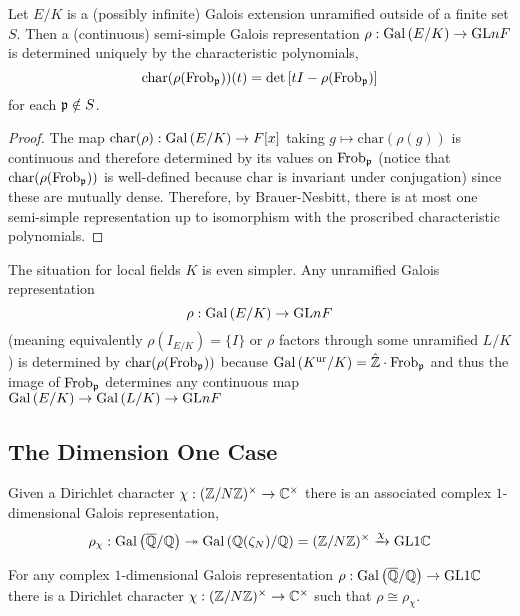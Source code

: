 \documentclass[12pt]{article}
\begin{document}
\begin{thm}
Let $E/K$ is a (possibly infinite) Galois extension unramified outside of a finite set $S$. Then a (continuous) semi-simple Galois representation $\rho : \mathrm{Gal}\left( E/K \right) \to \mathrm{GL}{n}{F}$ is determined uniquely by the characteristic polynomials,
\[ \mathrm{char}(\rho(\mathrm{Frob}_{\mathfrak{p}}))(t) = \det{[t I - \rho(\mathrm{Frob}_{\mathfrak{p}})]} \]
for each $\mathfrak{p} \notin S$.
\end{thm}

\begin{proof}
The map $\mathrm{char}(\rho) : \mathrm{Gal}\left( E/K \right) \to F[x]$ taking $g \mapsto \mathrm{char}(\rho(g))$ is continuous and therefore determined by its values on $\mathrm{Frob}_{\mathfrak{p}}$ (notice that $\mathrm{char}(\rho(\mathrm{Frob}_{\mathfrak{p}}))$ is well-defined because $\mathrm{char}$ is invariant under conjugation) since these are mutually dense. Therefore, by Brauer-Nesbitt, there is at most one semi-simple representation up to isomorphism with the proscribed characteristic polynomials.
\end{proof}

\begin{rmk}
The situation for local fields $K$ is even simpler. Any unramified Galois representation 
\[ \rho : \mathrm{Gal}\left( E/K \right) \to \mathrm{GL}{n}{F} \]
(meaning equivalently $\rho(I_{E/K}) = \{ I \}$ or $\rho$ factors through some unramified $L/K$) is determined by $\mathrm{char}(\rho(\mathrm{Frob}_{\mathfrak{p}}))$ because $\mathrm{Gal}\left( K^{\text{ur}}/K \right) = \hat{\mathbb{Z}} \cdot \mathrm{Frob}_{\mathfrak{p}}$ and thus the image of $\mathrm{Frob}_{\mathfrak{p}}$ determines any continuous map $\mathrm{Gal}\left( E/K \right) \to \mathrm{Gal}\left( L/K \right) \to \mathrm{GL}{n}{F}$  
\end{rmk}

\subsection{The Dimension One Case}

\begin{defn}
Given a Dirichlet character $\chi : (\mathbb{Z} / N \mathbb{Z})^\times \to \mathbb{C}^\times$ there is an associated complex $1$-dimensional Galois representation,
\[ \rho_\chi : \mathrm{Gal}\left( \overline{\mathbb{Q}}/\mathbb{Q} \right) \twoheadrightarrow \mathrm{Gal}\left( \mathbb{Q}(\zeta_N)/\mathbb{Q} \right) = (\mathbb{Z} / N \mathbb{Z})^\times \xrightarrow{\chi} \mathrm{GL}{1}{\mathbb{C}} \]
\end{defn}

\begin{prop}
For any complex $1$-dimensional Galois representation $\rho : \mathrm{Gal}\left( \overline{\mathbb{Q}}/\mathbb{Q} \right) \to \mathrm{GL}{1}{\mathbb{C}}$ there is a Dirichlet character $\chi : (\mathbb{Z} / N \mathbb{Z})^\times \to \mathbb{C}^\times$ such that $\rho \cong \rho_\chi$.
\end{prop}
\end{document}
